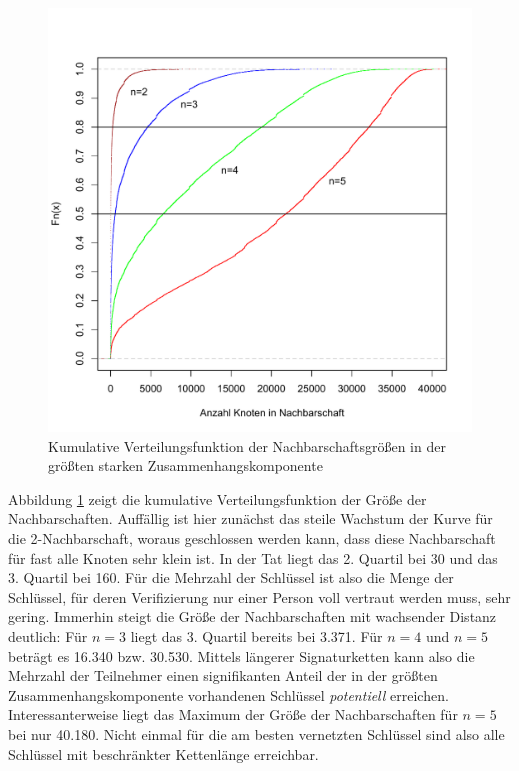 \begin{figure}[th!]
  \centering
  \includegraphics[scale=0.6]{images/neighbourhood-cdf.pdf}
  \caption{Kumulative Verteilungsfunktion der Nachbarschaftsgrö{\ss}en
    in der größten starken Zusammenhangskomponente}
  \label{fig:neighbourhood-cdf}
\end{figure}

Abbildung \ref{fig:neighbourhood-cdf} zeigt die kumulative
Verteilungsfunktion der Größe der Nachbarschaften. Auffällig
ist hier zunächst das steile Wachstum der Kurve für die
2-Nachbarschaft, woraus geschlossen werden kann, dass diese
Nachbarschaft für fast alle Knoten sehr klein ist. In der Tat liegt
das 2. Quartil bei 30 und das 3. Quartil bei 160. Für die Mehrzahl
der Schlüssel ist also die Menge der Schlüssel, für deren
Verifizierung nur einer Person voll vertraut werden muss, sehr
gering. Immerhin steigt die Größe der Nachbarschaften mit
wachsender Distanz deutlich: Für $n=3$ liegt das 3. Quartil bereits
bei 3.371. Für $n=4$ und $n=5$ beträgt es 16.340 bzw. 30.530. Mittels
längerer Signaturketten kann also die Mehrzahl der Teilnehmer einen
signifikanten Anteil der in der größten Zusammenhangskomponente
vorhandenen Schlüssel \emph{potentiell}
erreichen. Interessanterweise liegt das Maximum der
Größe der Nachbarschaften für $n=5$ bei nur 40.180. Nicht einmal für
die am besten vernetzten Schlüssel sind also alle Schlüssel mit
beschränkter Kettenlänge erreichbar.

